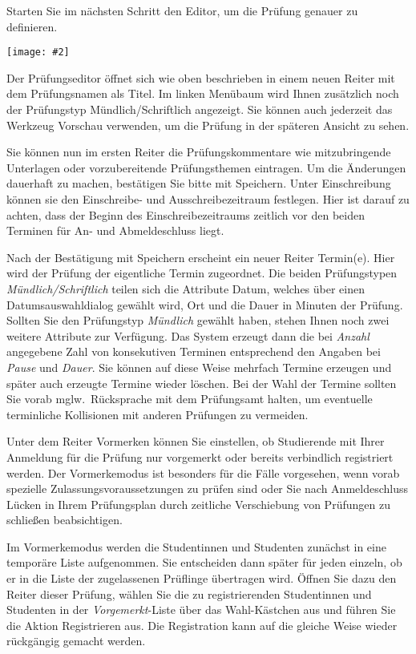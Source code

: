 \documentclass[a4paper,11pt]{article}
\newcommand{\bild}[2]{
    \begin{center}\texttt{[image: \#2]}\end{center}
}
\newcommand{\knopf}[1]{{\sc #1}}
\begin{document}
Starten Sie im nächsten Schritt den Editor, um die Prüfung genauer zu
definieren.

\bild{.9}{Pruefung-Erzeugen-Editor}

Der Prüfungseditor öffnet sich wie oben beschrieben in einem neuen Reiter mit
dem Prüfungsnamen als Titel. Im linken Menübaum wird Ihnen zusätzlich noch der
Prüfungstyp \knopf{Mündlich/Schriftlich} angezeigt. Sie können auch jederzeit
das Werkzeug \knopf{Vorschau} verwenden, um die Prüfung in der späteren
Ansicht zu sehen.

Sie können nun im ersten Reiter die Prüfungskommentare wie mitzubringende
Unterlagen oder vorzubereitende Prüfungsthemen eintragen. Um die Änderungen
dauerhaft zu machen, bestätigen Sie bitte mit \knopf{Speichern}. Unter
\knopf{Einschreibung} können sie den Einschreibe- und Ausschreibezeitraum
festlegen. Hier ist darauf zu achten, dass der Beginn des Einschreibezeitraums
zeitlich vor den beiden Terminen für An- und Abmeldeschluss liegt.

Nach der Bestätigung mit \knopf{Speichern} erscheint ein neuer Reiter
\knopf{Termin(e)}. Hier wird der Prüfung der eigentliche Termin zugeordnet.
Die beiden Prüfungstypen {\em Mündlich/Schriftlich} teilen sich die Attribute
Datum, welches über einen Datumsauswahldialog gewählt wird, Ort und die Dauer
in Minuten der Prüfung. Sollten Sie den Prüfungstyp {\em Mündlich} gewählt
haben, stehen Ihnen noch zwei weitere Attribute zur Verfügung. Das System
erzeugt dann die bei {\em Anzahl} angegebene Zahl von konsekutiven Terminen
entsprechend den Angaben bei {\em Pause} und {\em Dauer}.  Sie können auf
diese Weise mehrfach Termine erzeugen und später auch erzeugte Termine wieder
löschen.  Bei der Wahl der Termine sollten Sie vorab mglw.\ Rücksprache mit
dem Prüfungsamt halten, um eventuelle terminliche Kollisionen mit anderen
Prüfungen zu vermeiden.

Unter dem Reiter \knopf{Vormerken} können Sie einstellen, ob Studierende mit
Ihrer Anmeldung für die Prüfung nur vorgemerkt oder bereits verbindlich
registriert werden.  Der Vormerkemodus ist besonders für die Fälle vorgesehen,
wenn vorab spezielle Zulassungsvoraussetzungen zu prüfen sind oder Sie nach
Anmeldeschluss Lücken in Ihrem Prüfungsplan durch zeitliche Verschiebung von
Prüfungen zu schließen beabsichtigen.  

Im Vormerkemodus werden die Studentinnen und Studenten zunächst in eine temporäre
Liste aufgenommen. Sie entscheiden dann später für jeden einzeln,
ob er in die Liste der zugelassenen Prüflinge übertragen wird.
Öffnen Sie dazu den Reiter dieser Prüfung, wählen Sie die zu registrierenden
Studentinnen und Studenten in der {\em Vorgemerkt}-Liste über das Wahl-Kästchen aus und führen
Sie die Aktion \knopf{Registrieren} aus. Die Registration kann auf die gleiche
Weise wieder rückgängig gemacht werden.
\end{document}
